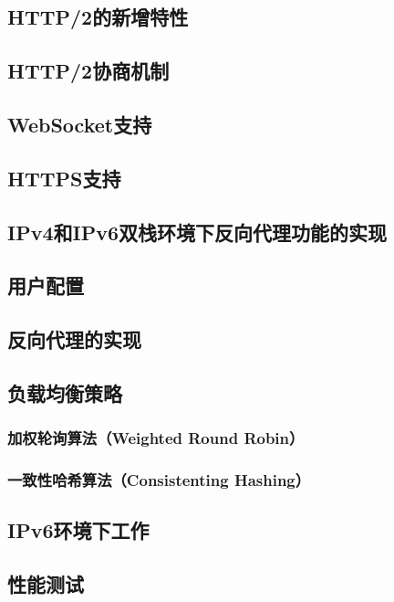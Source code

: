 \documentclass[twoside]{CUGThesis}
\begin{document}
	\subsection{HTTP/2的新增特性}
	
	\subsection{HTTP/2协商机制}

	\subsection{WebSocket支持}

	\subsection{HTTPS支持}
	

	\begin{spacing}{2}
		\section{IPv4和IPv6双栈环境下反向代理功能的实现}
	\end{spacing}
	\subsection{用户配置}
	\subsection{反向代理的实现}
	\subsection{负载均衡策略}
	\subsubsection{加权轮询算法（Weighted Round Robin）}
	\subsubsection{一致性哈希算法（Consistenting Hashing）}
	\subsection{IPv6环境下工作}

	\begin{spacing}{2}
		\section{性能测试}
	\end{spacing}
\end{document}
